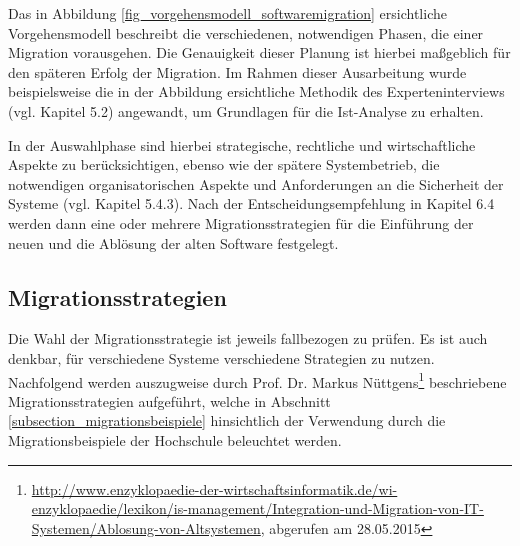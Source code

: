 Das in Abbildung \ref{fig_vorgehensmodell_softwaremigration} ersichtliche Vorgehensmodell beschreibt die verschiedenen, notwendigen Phasen, die einer Migration vorausgehen. Die Genauigkeit dieser Planung ist hierbei maßgeblich für den späteren Erfolg der Migration. Im Rahmen dieser Ausarbeitung wurde beispielsweise die in der Abbildung ersichtliche Methodik des Experteninterviews (vgl. Kapitel 5.2) angewandt, um Grundlagen für die Ist-Analyse zu erhalten.

In der Auswahlphase sind hierbei strategische, rechtliche und wirtschaftliche Aspekte zu berücksichtigen, ebenso wie der spätere Systembetrieb, die notwendigen organisatorischen Aspekte und Anforderungen an die Sicherheit der Systeme (vgl. Kapitel 5.4.3). Nach der Entscheidungsempfehlung in Kapitel 6.4 werden dann eine oder mehrere Migrationsstrategien für die Einführung der neuen und die Ablösung der alten Software festgelegt.

\subsection{Migrationsstrategien}
Die Wahl der Migrationsstrategie ist jeweils fallbezogen zu prüfen. Es ist auch denkbar, für verschiedene Systeme verschiedene Strategien zu nutzen. Nachfolgend werden auszugweise durch Prof. Dr. Markus Nüttgens\footnote{\url{http://www.enzyklopaedie-der-wirtschaftsinformatik.de/wi-enzyklopaedie/lexikon/is-management/Integration-und-Migration-von-IT-Systemen/Ablosung-von-Altsystemen}, abgerufen am 28.05.2015} beschriebene Migrationsstrategien aufgeführt, welche in Abschnitt \ref{subsection_migrationsbeispiele} hinsichtlich der Verwendung durch die Migrationsbeispiele der Hochschule beleuchtet werden.

